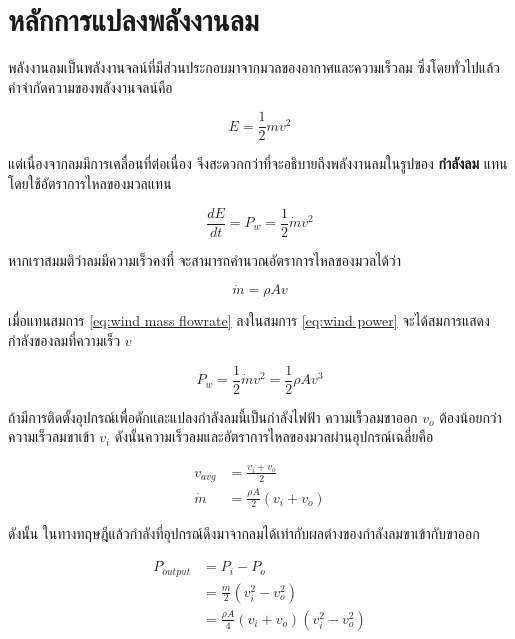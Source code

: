 \documentclass[a4paper,nobib,openany,10pt]{tufte-book}
\begin{document}
\section{หลักการแปลงพลังงานลม}
\label{sec:org452ccda}
พลังงานลมเป็นพลังงานจลน์ที่มีส่วนประกอบมาจากมวลของอากาศและความเร็วลม
ซึ่งโดยทั่วไปแล้ว คำจำกัดความของพลังงานจลน์คือ

\[E = \frac{1}{2} mv^2\]

แต่เนื่องจากลมมีการเคลื่อนที่ต่อเนื่อง
จึงสะดวกกว่าที่จะอธิบายถึงพลังงานลมในรูปของ \textbf{กำลังลม} แทนโดยใช้อัตราการไหลของมวลแทน

\begin{equation}
\label{eq:wind power}
  \frac{dE}{dt} = P_w = \frac{1}{2} \dot{m} v^2
\end{equation}

หากเราสมมติว่าลมมีความเร็วคงที่ จะสามารถคำนวณอัตราการไหลของมวลได้ว่า

\begin{equation}
\label{eq:wind mass flowrate}
  \dot{m} = \rho A v
\end{equation}

เมื่อแทนสมการ \ref{eq:wind mass flowrate} ลงในสมการ \ref{eq:wind power} จะได้สมการแสดงกำลังของลมที่ความเร็ว \(v\)

\begin{equation}
\label{eq:wind power v}
  P_w = \frac{1}{2} \dot{m} v^2 = \frac{1}{2} \rho A v^3
\end{equation}

ถ้ามีการติดตั้งอุปกรณ์เพื่อดักและแปลงกำลังลมนี้เป็นกำลังไฟฟ้า
ความเร็วลมขาออก \(v_o\) ต้องน้อยกว่าความเร็วลมขาเข้า \(v_i\)
ดังนั้นความเร็วลมและอัตราการไหลของมวลผ่านอุปกรณ์เฉลี่ยคือ

\begin{align}
\label{eq:average wind speed through turbine}
  v_{avg} &= \frac{v_i + v_o}{2} \\
  \dot{m} &= \frac{\rho A}{2} \left( v_i + v_o \right)
\end{align}

ดังนั้น
ในทางทฤษฎีแล้วกำลังที่อุปกรณ์ดึงมาจากลมได้เท่ากับผลต่างของกำลังลมขาเข้ากับขาออก

\begin{align}
  P_{output} &= P_{i} - P_{o} \nonumber \\
             &= \frac{\dot{m}}{2} \left( v_i^2 - v_o^2 \right) \nonumber \\
             &= \frac{\rho A}{4} \left( v_i + v_o \right)\left( v_i^2 - v_o^2 \right)
\end{align}
\end{document}
